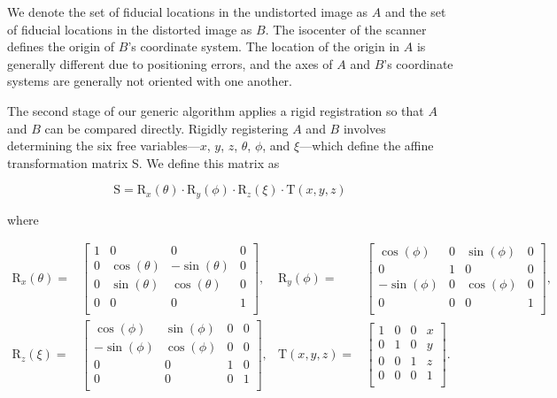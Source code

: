 \documentclass[12pt]{article}
\begin{document}
We denote the set of fiducial locations in the undistorted image as $A$ and the set of fiducial locations in the distorted image as $B$.  The isocenter of the scanner defines the origin of $B$'s coordinate system.  The location of the origin in $A$ is generally different due to positioning errors, and the axes of $A$ and $B$'s coordinate systems are generally not oriented with one another.

The second stage of our generic algorithm applies a rigid registration so that $A$ and $B$ can be compared directly.  Rigidly registering $A$ and $B$ involves determining the six free variables---$x$, $y$, $z$, $\theta$, $\phi$, and $\xi$---which define the affine transformation matrix S.  We define this matrix as

\begin{equation*}
    \mathrm{S} = \mathrm{R}_x(\theta) \cdot \mathrm{R}_y(\phi) \cdot \mathrm{R}_z(\xi) \cdot \mathrm{T}(x, y, z)
\end{equation*}

where

\begin{align*}
    \mathrm{R}_x(\theta) =&
    \begin{bmatrix}
        1 & 0 & 0 & 0\\
        0 & \cos(\theta) & -\sin(\theta) & 0\\
        0 & \sin(\theta) & \cos(\theta) & 0\\
        0 & 0 & 0 & 1\\
    \end{bmatrix},&
    \mathrm{R}_y(\phi) =&
    \begin{bmatrix}
        \cos(\phi) & 0 & \sin(\phi) & 0\\
        0 & 1 & 0 & 0\\
        -\sin(\phi) & 0 & \cos(\phi) & 0\\
        0 & 0 & 0 & 1\\
    \end{bmatrix},
    \\
    \mathrm{R}_z(\xi) =&
    \begin{bmatrix}
        \cos(\phi) & \sin(\phi) & 0 & 0\\
        -\sin(\phi) & \cos(\phi) & 0 & 0\\
        0 & 0 & 1 & 0\\
        0 & 0 & 0 & 1\\
    \end{bmatrix},&
    \mathrm{T}(x, y, z) =&
    \begin{bmatrix}
        1 & 0 & 0 & x\\
        0 & 1 & 0 & y\\
        0 & 0 & 1 & z\\
        0 & 0 & 0 & 1\\
    \end{bmatrix}.
\end{align*}
\end{document}
